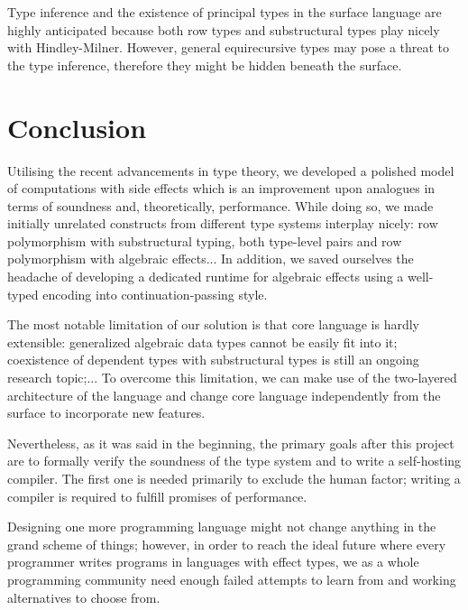 \documentclass[conference]{IEEEtran}
\begin{document}
Type inference and the existence of principal types in the surface language are
highly anticipated because both row types and substructural types play nicely
with Hindley-Milner. However, general equirecursive types may pose a threat to
the type inference, therefore they might be hidden beneath the surface.

\section{Conclusion}

Utilising the recent advancements in type theory, we developed a polished model
of computations with side effects which is an improvement upon analogues in
terms of soundness and, theoretically, performance. While doing so, we made
initially unrelated constructs from different type systems interplay nicely: row
polymorphism with substructural typing, both type-level pairs and row
polymorphism with algebraic effects... In addition, we saved ourselves the
headache of developing a dedicated runtime for algebraic effects using a
well-typed encoding into continuation-passing style.

The most notable limitation of our solution is that core language is hardly
extensible: generalized algebraic data types cannot be easily fit into it;
coexistence of dependent types with substructural types is still an ongoing
research topic;... To overcome this limitation, we can make use of the
two-layered architecture of the language and change core language independently
from the surface to incorporate new features.

Nevertheless, as it was said in the beginning, the primary goals after this
project are to formally verify the soundness of the type system and to write a
self-hosting compiler. The first one is needed primarily to exclude the human
factor; writing a compiler is required to fulfill promises of performance.

Designing one more programming language might not change anything in the grand
scheme of things; however, in order to reach the ideal future where every
programmer writes programs in languages with effect types, we as a whole
programming community need enough failed attempts to learn from and working
alternatives to choose from.



\end{document}
